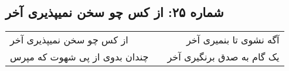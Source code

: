 \begin{center}
\section*{شماره ۲۵: از کس چو سخن نمیپذیری آخر}
\label{sec:025}
\begin{longtable}{l p{0.5cm} r}
از کس چو سخن نمیپذیری آخر
&&
آگه نشوی تا بنمیری‌ آخر
\\
چندان بدوی از پی شهوت که مپرس
&&
یک گام به صدق برنگیری آخر
\\
\end{longtable}
\end{center}
